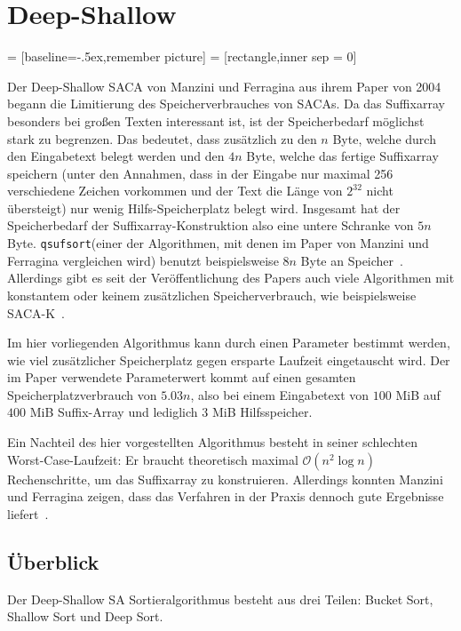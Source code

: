 \section{Deep-Shallow}
 = [baseline=-.5ex,remember picture]
 = [rectangle,inner sep = 0]

\def\divsufsort{\texttt{divsufsort}\xspace}
\def\qsufsort{\texttt{qsufsort}\xspace}
\def\cache{\texttt{cache}\xspace}

Der  Deep-Shallow SACA von Manzini und Ferragina aus ihrem Paper von 2004~\cite{saca:4} begann die Limitierung des Speicherverbrauches von SACAs.
Da das Suffixarray besonders bei großen Texten interessant ist, ist der Speicherbedarf möglichst stark zu begrenzen.
Das bedeutet, dass zusätzlich zu den $n$ Byte, welche durch den Eingabetext belegt werden und den $4n$ Byte, welche das fertige Suffixarray speichern (unter den Annahmen, dass in der Eingabe nur maximal 256 verschiedene Zeichen vorkommen und der Text die Länge von $2^{32}$ nicht übersteigt) nur wenig Hilfs-Speicherplatz belegt wird.
Insgesamt hat der Speicherbedarf der Suffixarray-Konstruktion also eine untere Schranke von $5n$ Byte.
\qsufsort (einer der Algorithmen, mit denen im Paper von Manzini und Ferragina vergleichen wird) benutzt beispielsweise $8n$ Byte an Speicher~\cite{saca:4}.
Allerdings gibt es seit der Veröffentlichung des Papers auch viele Algorithmen mit konstantem oder keinem zusätzlichen Speicherverbrauch, wie beispielsweise SACA-K~\cite{Nong}.

Im hier vorliegenden Algorithmus kann durch einen Parameter bestimmt werden, wie viel zusätzlicher Speicherplatz gegen ersparte Laufzeit eingetauscht wird.
Der im Paper verwendete Parameterwert kommt auf einen gesamten Speicherplatzverbrauch von $5.03n$, also bei einem Eingabetext von $100$ MiB auf $400$ MiB Suffix-Array und lediglich 3 MiB Hilfsspeicher.

Ein Nachteil des hier vorgestellten Algorithmus besteht in seiner schlechten Worst-Case-Laufzeit:
Er braucht theoretisch maximal $\mathcal O(n^2 \log n)$ Rechenschritte, um das Suffixarray zu konstruieren.
Allerdings konnten Manzini und Ferragina zeigen, dass das Verfahren in der Praxis dennoch gute Ergebnisse liefert~\cite{saca:4}.

\subsection{Überblick}

Der Deep-Shallow SA Sortieralgorithmus besteht aus drei Teilen: Bucket Sort, Shallow Sort und Deep Sort.

